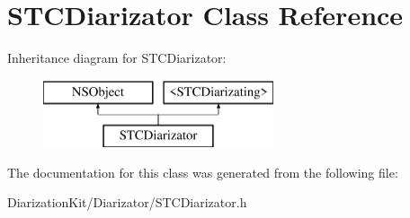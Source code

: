 \hypertarget{interface_s_t_c_diarizator}{}\section{S\+T\+C\+Diarizator Class Reference}
\label{interface_s_t_c_diarizator}
Inheritance diagram for S\+T\+C\+Diarizator\+:\begin{figure}[H]
\begin{center}
\leavevmode
\includegraphics[height=2.000000cm]{interface_s_t_c_diarizator}
\end{center}
\end{figure}


The documentation for this class was generated from the following file\+:\begin{DoxyCompactItemize}
\item 
Diarization\+Kit/\+Diarizator/S\+T\+C\+Diarizator.\+h\end{DoxyCompactItemize}
